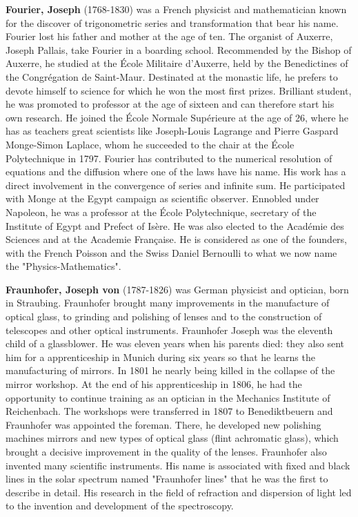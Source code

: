 \textbf{Fourier, Joseph} (1768-1830) was a French physicist and mathematician known for the discover of trigonometric series and transformation that bear his name. Fourier lost his father and mother at the age of ten. The organist of Auxerre, Joseph Pallais, take Fourier in a boarding school. Recommended by the Bishop of Auxerre, he studied at the École Militaire d'Auxerre, held by the Benedictines of the Congrégation de Saint-Maur. Destinated at the monastic life, he prefers to devote himself to science for which he won the most first prizes. Brilliant student, he was promoted to professor at the age of sixteen and can therefore start his own research. He joined the École Normale Supérieure at the age of 26, where he has as teachers great scientists like Joseph-Louis Lagrange and Pierre Gaspard Monge-Simon Laplace, whom he succeeded to the chair at the École Polytechnique in 1797. Fourier has contributed to the numerical resolution of equations and the diffusion where one of the laws have his name. His work has a direct involvement in the convergence of series and infinite sum. He participated with Monge at the Egypt campaign as scientific observer. Ennobled under Napoleon, he was a professor at the École Polytechnique, secretary of the Institute of Egypt and Prefect of Isère. He was also elected to the Académie des Sciences and at the Academie Française. He is considered as one of the founders, with the French Poisson and the Swiss Daniel Bernoulli to what we now name the "Physics-Mathematics".

\textbf{Fraunhofer, Joseph von} (1787-1826) was  German physicist and optician, born in Straubing. Fraunhofer brought many improvements in the manufacture of optical glass, to grinding and polishing of lenses and to the construction of telescopes and other optical instruments. Fraunhofer Joseph was the eleventh child of a glassblower. He was eleven years when his parents died: they also sent him for a apprenticeship in Munich during six years so that he learns the manufacturing of mirrors. In 1801 he nearly being killed in the collapse of the mirror workshop. At the end of his apprenticeship in 1806, he had the opportunity to continue training as an optician in the Mechanics Institute of Reichenbach. The workshops were transferred in 1807 to Benediktbeuern and Fraunhofer was appointed the foreman. There, he developed new polishing machines mirrors and new types of optical glass (flint achromatic glass), which brought a decisive improvement in the quality of the lenses. Fraunhofer also invented many scientific instruments. His name is associated with fixed and black lines in the solar spectrum named "Fraunhofer lines" that he was the first to describe in detail. His research in the field of refraction and dispersion of light led to the invention and development of the spectroscopy.

